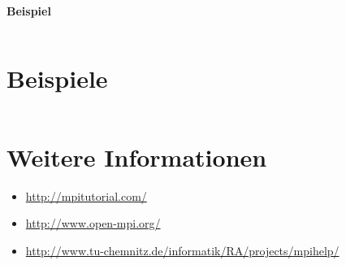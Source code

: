 \textbf{Beispiel}
\inputminted[numbersep=5pt, tabsize=4]{c}{scripts/mpi/mpi-reduce-example.c}

\section{Beispiele}

\inputminted[numbersep=5pt, tabsize=4]{c}{scripts/mpi/mpi-sum-reduce.c}

\section{Weitere Informationen}
\begin{itemize}
    \item \url{http://mpitutorial.com/}
    \item \url{http://www.open-mpi.org/}
    \item \url{http://www.tu-chemnitz.de/informatik/RA/projects/mpihelp/}
\end{itemize}

